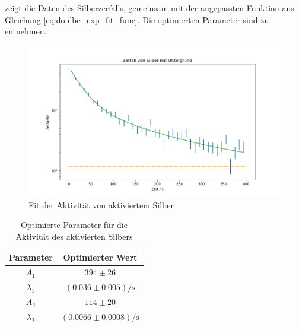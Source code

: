 
 zeigt die Daten des Silberzerfalls, gemeinsam mit der angepassten Funktion aus Gleichung \ref{eq:doulbe_exp_fit_func}. Die optimierten Parameter sind  zu entnehmen.

\begin{figure}[H]
    \centering
    \includegraphics[width=.9\textwidth]{files/silber.png}
    \caption{Fit der Aktivität von aktiviertem Silber}
    \label{plot:fit_silber}
\end{figure}

\begin{table}[H]
    \centering
    \begin{tabular}{c|c}
        Parameter & Optimierter Wert\\\hline
        $A_1$ & $394 \pm 26$\\
        $\lambda_1$ & $(0.036 \pm 0.005) \si{\per\second}$\\\hline
        $A_2$ & $114 \pm 20$\\
        $\lambda_2$ & $(0.0066 \pm 0.0008) \si{\per\second}$
    \end{tabular}
    \caption{Optimierte Parameter für die Aktivität des aktivierten Silbers}
    \label{tab:fit_silver_fitted}
\end{table}

